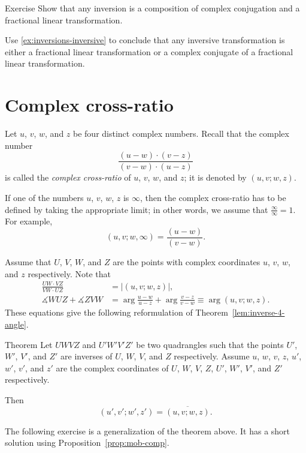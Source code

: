 \begin{thm}{Exercise}\label{ex:inversion-Mob}
Show that any inversion is a composition of complex conjugation and a fractional linear transformation.

Use \ref{ex:inversions-inversive} to conclude that any inversive transformation is either a fractional linear transformation or a complex conjugate of a fractional linear transformation.
\end{thm}

\section{Complex cross-ratio}

Let $u$, $v$, $w$, and $z$ be four distinct complex numbers.
Recall that 
the complex number
$$
\frac{(u-w)\cdot(v-z)}{(v-w)\cdot(u-z)}$$
is called the \emph{complex cross-ratio} of $u$, $v$, $w$, and $z$; 
it is denoted by $(u,v;w,z)$.

If one of the numbers $u$, $v$, $w$, $z$ is $\infty$, 
then the complex cross-ratio has to be defined by taking the appropriate limit; in other words, we assume that $\frac\infty\infty=1$.
For example,
$$(u, v; w, \infty)=\frac{(u-w)}{(v-w)}.$$

Assume that $U$, $V$, $W$, and  $Z$ are the points with complex coordinates  
$u$, $v$, $w$, and $z$ respectively.
Note that 
\begin{align*}
\frac{UW\cdot VZ}{VW\cdot UZ}&=|(u,v;w,z)|,
\\
\measuredangle WUZ +\measuredangle ZVW&=\arg\frac{u-w}{u-z}+\arg\frac{v-z}{v-w}\equiv \arg(u,v;w,z).
\end{align*}
These equations give the following reformulation of Theorem~\ref{lem:inverse-4-angle}.

\begin{thm}{Theorem}\label{lem:inverse-4-angle-C}
Let $UWVZ$ and $U'W'V'Z'$  be two quadrangles 
such that the points $U'$, $W'$, $V'$, and $Z'$ are inverses of $U$, $W$, $V$, and $Z$ respectively.
Assume $u$, $w$, $v$, $z$, $u'$, $w'$, $v'$, and $z'$ are the complex coordinates of $U$, $W$, $V$, $Z$, $U'$, $W'$, $V'$, and $Z'$ respectively.

Then 
$$(u',v';w',z')=\overline{(u,v;w,z)}.$$

\end{thm}

The following exercise is a generalization of the theorem above.
It has a short solution using Proposition~\ref{prop:mob-comp}.

